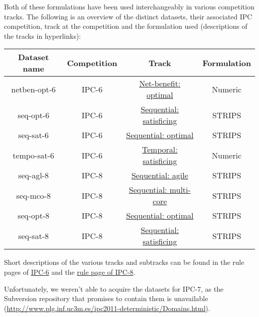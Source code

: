 \documentclass[10pt,a4paper,oneside]{article}
\begin{document}
Both of these formulations have been used interchangeably in various competition tracks.
The following is an overview of the distinct datasets, their associated IPC competition, track at the competition and the formulation used (descriptions of the tracks in hyperlinks):

\begin{center}
\begin{tabular}{|c|c|c|c|}
\hline 
Dataset name & Competition & Track & Formulation \\ 
\hline 
netben-opt-6 & IPC-6 & \href{http://icaps-conference.org/ipc2008/deterministic/NetBenefitOptimization.html}{Net-benefit: optimal} & Numeric \\ 
\hline 
seq-opt-6 & IPC-6 & \href{http://icaps-conference.org/ipc2008/deterministic/SequentialSatisficing.html}{Sequential: satisficing} & STRIPS \\ 
\hline 
seq-sat-6 & IPC-6 & \href{http://icaps-conference.org/ipc2008/deterministic/SequentialOptimization.html}{Sequential: optimal} & STRIPS \\ 
\hline 
tempo-sat-6 & IPC-6 & \href{http://icaps-conference.org/ipc2008/deterministic/TemporalSatisficing.html}{Temporal: satisficing} & Numeric \\ 
\hline 
seq-agl-8 & IPC-8 & \href{https://helios.hud.ac.uk/scommv/IPC-14/seqagi.html}{Sequential: agile} & STRIPS \\ 
\hline 
seq-mco-8 & IPC-8 & \href{https://helios.hud.ac.uk/scommv/IPC-14/seqmulti.html}{Sequential: multi-core} & STRIPS \\ 
\hline 
seq-opt-8 & IPC-8 & \href{https://helios.hud.ac.uk/scommv/IPC-14/seqopt.html}{Sequential: optimal} & STRIPS \\ 
\hline 
seq-sat-8 & IPC-8 & \href{https://helios.hud.ac.uk/scommv/IPC-14/seqsat.html}{Sequential: satisficing} & STRIPS \\ 
\hline 
\end{tabular} 
\end{center}

Short descriptions of the various tracks and subtracks can be found in the rule pages of
\href{https://helios.hud.ac.uk/scommv/IPC-14/rules.html}{IPC-6}
and the  \href{http://icaps-conference.org/ipc2008/deterministic/CompetitionRules.html}{rule page of IPC-8}.

Unfortunately, we weren't able to acquire the datasets for IPC-7, as the Subversion repository that promises to contain them is unavailable (\url{http://www.plg.inf.uc3m.es/ipc2011-deterministic/Domains.html}).
\end{document}
